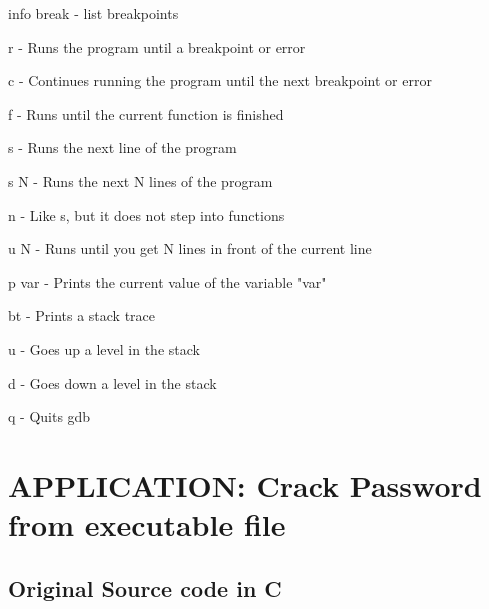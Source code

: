 \documentclass[12pt]{article}
\begin{document}
    info break - list breakpoints

    r - Runs the program until a breakpoint or error

    c - Continues running the program until the next breakpoint or error

    f - Runs until the current function is finished

    s - Runs the next line of the program

    s N - Runs the next N lines of the program

    n - Like s, but it does not step into functions

    u N - Runs until you get N lines in front of the current line

    p var - Prints the current value of the variable "var"

    bt - Prints a stack trace

    u - Goes up a level in the stack

    d - Goes down a level in the stack

    q - Quits gdb
\section{APPLICATION: Crack Password from executable file}


\subsection{Original Source code in C}\\
\end{document}
